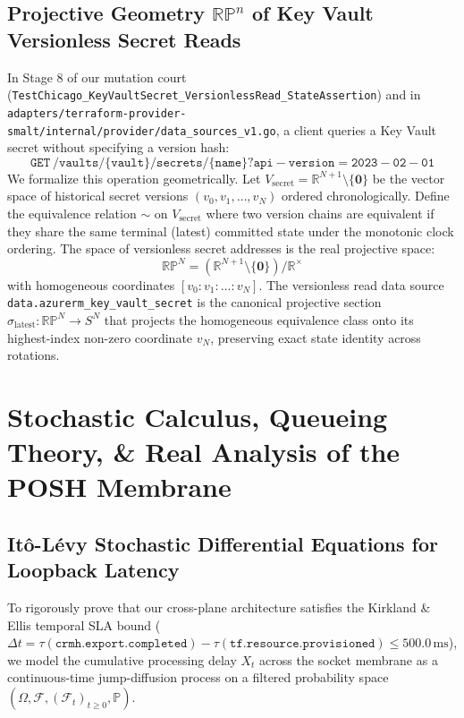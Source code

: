\documentclass[10pt,twoside,openany]{book}
\theoremstyle{plain}
\theoremstyle{definition}
\theoremstyle{remark}
\newcommand{\R}{\mathbb{R}}
\newcommand{\Prob}{\mathbb{P}}
\begin{document}
\section{Projective Geometry $\mathbb{RP}^n$ of Key Vault Versionless Secret Reads}
In Stage 8 of our mutation court (\texttt{TestChicago\_KeyVaultSecret\_VersionlessRead\_StateAssertion}) and in \texttt{adapters/terraform-provider-smalt/internal/provider/data\_sources\_v1.go}, a client queries a Key Vault secret without specifying a version hash:
\[
\mathtt{GET\ /vaults/\{vault\}/secrets/\{name\}?api-version=2023-02-01}
\]
We formalize this operation geometrically. Let $V_{\mathrm{secret}} = \R^{N+1} \setminus \{\mathbf{0}\}$ be the vector space of historical secret versions $(v_0, v_1, \dots, v_N)$ ordered chronologically. Define the equivalence relation $\sim$ on $V_{\mathrm{secret}}$ where two version chains are equivalent if they share the same terminal (latest) committed state under the monotonic clock ordering. The space of versionless secret addresses is the real projective space:
\begin{equation}
\mathbb{RP}^N = \left( \R^{N+1} \setminus \{\mathbf{0}\} \right) / \R^\times
\end{equation}
with homogeneous coordinates $[v_0 : v_1 : \dots : v_N]$. The versionless read data source \texttt{data.azurerm\_key\_vault\_secret} is the canonical projective section $\sigma_{\mathrm{latest}}: \mathbb{RP}^N \to S^N$ that projects the homogeneous equivalence class onto its highest-index non-zero coordinate $v_N$, preserving exact state identity across rotations.

\chapter{Stochastic Calculus, Queueing Theory, \& Real Analysis of the POSH Membrane}

\section{It\^o-L\'evy Stochastic Differential Equations for Loopback Latency}
To rigorously prove that our cross-plane architecture satisfies the Kirkland \& Ellis temporal SLA bound ($\Delta t = \tau(\mathtt{crmh.export.completed}) - \tau(\mathtt{tf.resource.provisioned}) \le 500.0\,\mathrm{ms}$), we model the cumulative processing delay $X_t$ across the socket membrane as a continuous-time jump-diffusion process on a filtered probability space $(\Omega, \mathcal{F}, (\mathcal{F}_t)_{t \ge 0}, \Prob)$.
\end{document}
